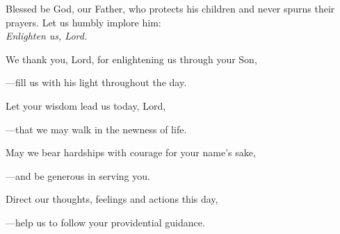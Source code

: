 \intercessions\indent

\begin{hangpar}

Blessed be God, our Father, who protects his children and never spurns their prayers. Let us humbly implore him:\\
\emph{Enlighten us, Lord.}

\medskip We thank you, Lord, for enlightening us through your Son,

{\color{red}---\thinspace}fill us with his light throughout the day.

\medskip Let your wisdom lead us today, Lord,

{\color{red}---\thinspace}that we may walk in the newness of life.

\medskip May we bear hardships with courage for your name’s sake,

{\color{red}---\thinspace}and be generous in serving you.

\medskip Direct our thoughts, feelings and actions this day,

{\color{red}---\thinspace}help us to follow your providential guidance.

\end{hangpar}

